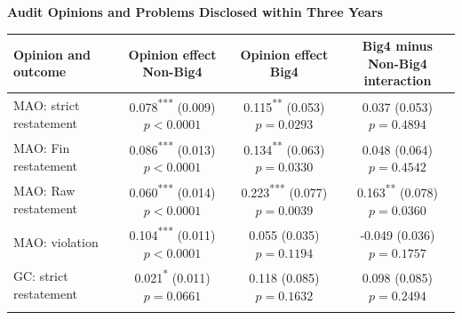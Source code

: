 \documentclass[10pt]{article}
\newcommand{\sym}[1]{\textsuperscript{#1}}
\begin{document}
\fontsize{10}{12}\selectfont\setlength{\parindent}{0pt}
\noindent\textbf{Audit Opinions and Problems Disclosed within Three Years}\par\medskip
\setlength{\tabcolsep}{3pt}\renewcommand{\arraystretch}{1.15}
\begin{tabular*}{\textwidth}{@{\extracolsep{\fill}}lccc@{}}
\toprule
Opinion and outcome & \shortstack{Opinion effect\\Non-Big4} & \shortstack{Opinion effect\\Big4} & \shortstack{Big4 minus Non-Big4\\interaction} \\
\midrule
MAO: strict restatement & \shortstack{0.078\sym{***}\\(0.009)\\$p<0.0001$} & \shortstack{0.115\sym{**}\\(0.053)\\$p=0.0293$} & \shortstack{0.037\sym{}\\(0.053)\\$p=0.4894$} \\ \addlinespace
MAO: Fin restatement & \shortstack{0.086\sym{***}\\(0.013)\\$p<0.0001$} & \shortstack{0.134\sym{**}\\(0.063)\\$p=0.0330$} & \shortstack{0.048\sym{}\\(0.064)\\$p=0.4542$} \\ \addlinespace
MAO: Raw restatement & \shortstack{0.060\sym{***}\\(0.014)\\$p<0.0001$} & \shortstack{0.223\sym{***}\\(0.077)\\$p=0.0039$} & \shortstack{0.163\sym{**}\\(0.078)\\$p=0.0360$} \\ \addlinespace
MAO: violation & \shortstack{0.104\sym{***}\\(0.011)\\$p<0.0001$} & \shortstack{0.055\sym{}\\(0.035)\\$p=0.1194$} & \shortstack{-0.049\sym{}\\(0.036)\\$p=0.1757$} \\ \addlinespace
GC: strict restatement & \shortstack{0.021\sym{*}\\(0.011)\\$p=0.0661$} & \shortstack{0.118\sym{}\\(0.085)\\$p=0.1632$} & \shortstack{0.098\sym{}\\(0.085)\\$p=0.2494$} \\ \addlinespace

\end{tabular*}
\end{document}
